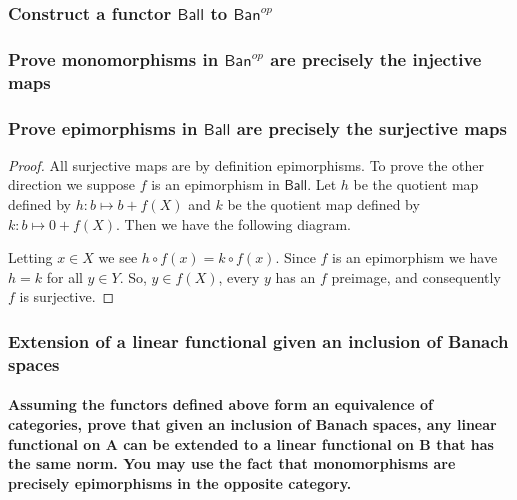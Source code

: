 \documentclass{article}
\begin{document}
\subsubsection{Construct a functor $\textsf{Ball}$ to $\textsf{Ban}^{op}$ }

\subsubsection{Prove monomorphisms in $\textsf{Ban}^{op}$ are precisely the injective maps}

\subsubsection{Prove epimorphisms in $\textsf{Ball}$ are precisely the surjective maps}

\begin{proof}
	
	All surjective maps are by definition epimorphisms.
	To prove the other direction we suppose $f$ is an epimorphism in $\textsf{Ball}$.
	Let $h$ be the quotient map defined by $h:b \mapsto b+f(X)$ and $k$ be the quotient map defined by $k:b \mapsto 0+f(X)$. Then we have the following diagram.
	
	\begin{center}
	\end{center}
	
	Letting $x\in X$ we see $h\circ f(x)= k\circ f(x)$.
	Since $f$ is an epimorphism we have $h=k$ for all $y\in Y$.
	So, $y\in f(X)$, every $y$ has an $f$ preimage, and consequently $f$ is surjective.
	
\end{proof}

\subsubsection{Extension of a linear functional given an inclusion of Banach spaces}
\paragraph{Assuming the functors defined above form an equivalence of categories, prove that given an inclusion of Banach spaces, any linear functional on A can be extended to a linear functional on B that has the same norm. You may use the fact that monomorphisms are precisely epimorphisms in the opposite category.}
\end{document}
